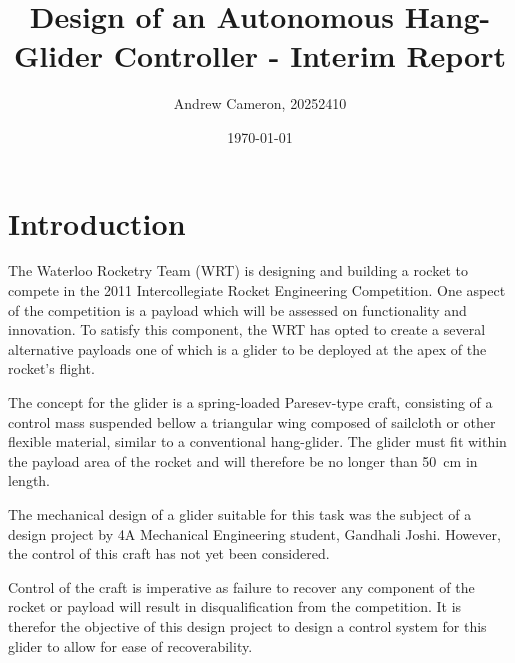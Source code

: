 \documentclass{sydeStyle}
\title{
Design of an Autonomous Hang-Glider Controller - Interim Report
}
\date{\today}
\author{Andrew Cameron, 20252410}
\begin{document}
\maketitle

\tableofcontents

\chapter{Introduction}

The Waterloo Rocketry Team (WRT) is designing and building a rocket to compete
in the 2011 Intercollegiate Rocket Engineering Competition. One aspect of the
competition is a payload which will be assessed on functionality and
innovation\cite{IREC}. To satisfy this component, the WRT has opted to create a
several alternative payloads one of which is a glider to be deployed at the apex
of the rocket's flight.

The concept for the glider is a spring-loaded Paresev-type craft,
consisting of a control mass suspended bellow a triangular wing composed of
sailcloth or other flexible material, similar to a conventional
hang-glider\cite{wiki:parasev}. The glider must fit within the payload area of
the rocket and will therefore be no longer than 50~cm in length.

The mechanical design of a glider suitable for this task was the subject of a
design project by 4A Mechanical Engineering student, Gandhali Joshi. However,
the control of this craft has not yet been considered.

Control of the craft is imperative as failure to recover any component of
the rocket or payload will result in disqualification from the
competition\cite{IREC}. It is therefor the objective of this design project to
design a control system for this glider to allow for ease of recoverability.
\end{document}
